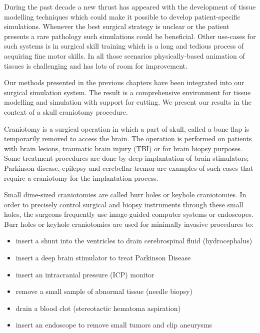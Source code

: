 \label{chapter:evaluation}
During the past decade a new thrust has appeared with the development of tissue modelling techniques 
which could make it possible to develop patient-specific simulations. Whenever the best surgical strategy 
is unclear or the patient presents a rare pathology such simulations could be beneficial. Other use-cases for such systems is in surgical skill training which is a long 
and tedious process of acquiring fine motor skills. In all those scenarios physically-based animation of 
tissues is challenging and has lots of room for improvement. 

Our methods presented in the previous chapters have been integrated into our surgical simulation system. 
The result is a comprehensive environment for tissue modelling and simulation with support for cutting. 
We present our results in the context of a skull craniotomy procedure.

Craniotomy is a surgical operation in which a part of skull, called a bone flap is temporarily removed to access 
the brain. The operation is performed on patients with brain lesions, traumatic brain injury 
(TBI) or for brain biopsy purposes. Some treatment procedures are done by deep implantation of brain 
stimulators; Parkinson disease, epilepsy and cerebellar tremor are examples of such cases that require 
a craniotomy for the implantation process. 

Small dime-sized craniotomies are called burr holes or keyhole craniotomies. In 
order to precisely control surgical and biopsy instruments through these small holes, the surgeons 
frequently use image-guided computer systems or endoscopes. Burr holes or keyhole craniotomies are 
used for minimally invasive procedures to:

\begin{itemize}
 \item insert a shunt into the ventricles to drain cerebrospinal fluid (hydrocephalus)
 \item insert a deep brain stimulator to treat Parkinson Disease
 \item insert an intracranial pressure (ICP) monitor
 \item remove a small sample of abnormal tissue (needle biopsy)
 \item drain a blood clot (stereotactic hematoma aspiration)
 \item insert an endoscope to remove small tumors and clip aneurysms
\end{itemize}

